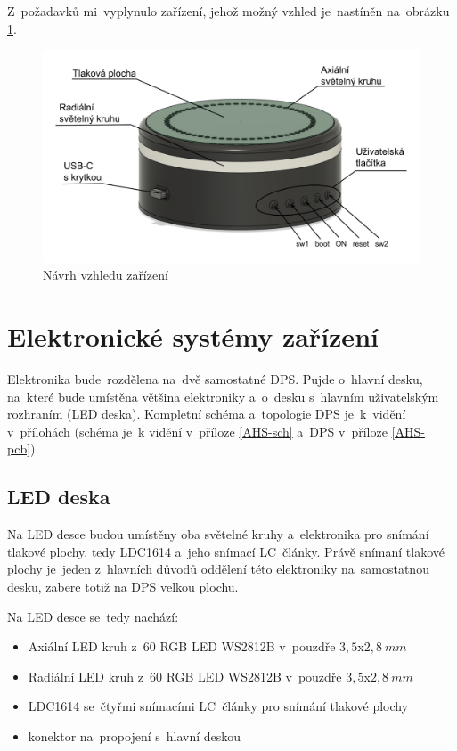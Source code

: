 Z~požadavků mi~vyplynulo zařízení, jehož možný vzhled je~nastíněn na~obrázku \ref{fig:AHS-nacrt}.
\begin{figure}[h]
    \centering
    \includegraphics[width=\textwidth]{text/PraktickaCast/img/AHS-nacrt.png}
    \caption{Návrh vzhledu zařízení}
    \label{fig:AHS-nacrt}
\end{figure}

\newpage
\section{Elektronické systémy zařízení}

Elektronika bude~rozdělena na~dvě samostatné DPS.
Pujde o~hlavní desku, na~které bude umístěna většina elektroniky a~o~desku s~hlavním uživatelským rozhraním (LED deska).
Kompletní schéma a~topologie DPS je~k~vidění v~přílohách (schéma je~k vidění v~příloze \ref{AHS-sch} a~DPS v~příloze \ref{AHS-pcb}).


\subsection{LED deska}
Na LED desce budou umístěny oba světelné kruhy a~elektronika pro snímání tlakové plochy, tedy LDC1614 \cite{LDC1614} a~jeho snímací LC~články.
Právě snímaní tlakové plochy je~jeden z~hlavních důvodů oddělení této elektroniky na~samostatnou desku, zabere totiž na DPS velkou plochu.

Na LED desce se~tedy nachází:
\begin{itemize}
    \item Axiální LED kruh z~60 RGB LED WS2812B v~pouzdře \(3,5\)\;x\;\(2,8~mm\)
    \item Radiální LED kruh z~60 RGB LED WS2812B v~pouzdře \(3,5\)\;x\;\(2,8~mm\)
    \item LDC1614 se~čtyřmi snímacími LC~články pro snímání tlakové plochy 
    \item konektor na~propojení s~hlavní deskou
\end{itemize}

